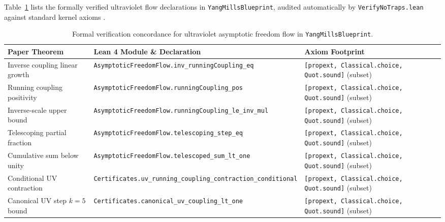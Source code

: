 \documentclass[11pt,a4paper]{article}
\begin{document}
Table~\ref{tab:paper1-concordance} lists the formally verified ultraviolet flow declarations in \texttt{YangMillsBlueprint}, audited automatically by \texttt{VerifyNoTraps.lean} against standard kernel axioms \cite{Mathlib4}.

\begin{table}[ht]
\centering
\scriptsize
\begin{tabular}{@{}p{4.3cm}p{6.6cm}p{3.4cm}@{}}
\toprule
Paper Theorem & Lean 4 Module \& Declaration & Axiom Footprint \\
\midrule
Inverse coupling linear growth & \texttt{AsymptoticFreedomFlow.}\newline\texttt{inv\_runningCoupling\_eq} & \texttt{[propext, Classical.choice,} \texttt{Quot.sound]} (subset) \\
Running coupling positivity & \texttt{AsymptoticFreedomFlow.}\newline\texttt{runningCoupling\_pos} & \texttt{[propext, Classical.choice,} \texttt{Quot.sound]} (subset) \\
Inverse-scale upper bound & \texttt{AsymptoticFreedomFlow.}\newline\texttt{runningCoupling\_le\_inv\_mul} & \texttt{[propext, Classical.choice,} \texttt{Quot.sound]} (subset) \\
Telescoping partial fraction & \texttt{AsymptoticFreedomFlow.}\newline\texttt{telescoping\_step\_eq} & \texttt{[propext, Classical.choice,} \texttt{Quot.sound]} (subset) \\
Cumulative sum below unity & \texttt{AsymptoticFreedomFlow.}\newline\texttt{telescoped\_sum\_lt\_one} & \texttt{[propext, Classical.choice,} \texttt{Quot.sound]} (subset) \\
Conditional UV contraction & \texttt{Certificates.}\newline\texttt{uv\_running\_coupling\_contraction\_conditional} & \texttt{[propext, Classical.choice,} \texttt{Quot.sound]} (subset) \\
Canonical UV step $k=5$ bound & \texttt{Certificates.}\newline\texttt{canonical\_uv\_coupling\_lt\_one} & \texttt{[propext, Classical.choice,} \texttt{Quot.sound]} (subset) \\
\bottomrule
\end{tabular}
\caption{Formal verification concordance for ultraviolet asymptotic freedom flow in \texttt{YangMillsBlueprint}.}
\label{tab:paper1-concordance}
\end{table}



\end{document}
